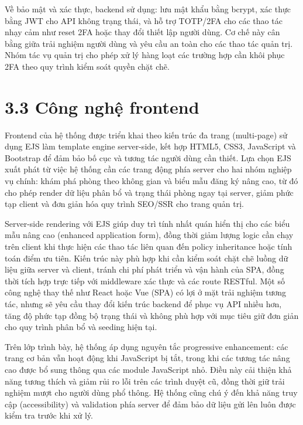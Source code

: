 Về bảo mật và xác thực, backend sử dụng: lưu mật khẩu bằng bcrypt, xác thực bằng JWT cho API không trạng thái, và hỗ trợ TOTP/2FA cho các thao tác nhạy cảm như reset 2FA hoặc thay đổi thiết lập người dùng. Cơ chế này cân bằng giữa trải nghiệm người dùng và yêu cầu an toàn cho các thao tác quản trị. Nhóm tác vụ quản trị cho phép xử lý hàng loạt các trường hợp cần khôi phục 2FA theo quy trình kiểm soát quyền chặt chẽ.

\section*{3.3 Công nghệ frontend}
Frontend của hệ thống được triển khai theo kiến trúc đa trang (multi-page) sử dụng EJS làm template engine server-side, kết hợp HTML5, CSS3, JavaScript và Bootstrap để đảm bảo bố cục và tương tác người dùng cần thiết. Lựa chọn EJS xuất phát từ việc hệ thống cần các trang động phía server cho hai nhóm nghiệp vụ chính: khám phá phòng theo không gian và biểu mẫu đăng ký nâng cao, từ đó cho phép render dữ liệu phân bổ và trạng thái phòng ngay tại server, giảm phức tạp client và đơn giản hóa quy trình SEO/SSR cho trang quản trị.

Server-side rendering với EJS giúp duy trì tính nhất quán hiển thị cho các biểu mẫu nâng cao (enhanced application form), đồng thời giảm lượng logic cần chạy trên client khi thực hiện các thao tác liên quan đến policy inheritance hoặc tính toán điểm ưu tiên. Kiến trúc này phù hợp khi cần kiểm soát chặt chẽ luồng dữ liệu giữa server và client, tránh chi phí phát triển và vận hành của SPA, đồng thời tích hợp trực tiếp với middleware xác thực và các route RESTful. Một số công nghệ thay thế như React hoặc Vue (SPA) có lợi ở mặt trải nghiệm tương tác, nhưng sẽ yêu cầu thay đổi kiến trúc backend để phục vụ API nhiều hơn, tăng độ phức tạp đồng bộ trạng thái và không phù hợp với mục tiêu giữ đơn giản cho quy trình phân bổ và seeding hiện tại.

Trên lớp trình bày, hệ thống áp dụng nguyên tắc progressive enhancement: các trang cơ bản vẫn hoạt động khi JavaScript bị tắt, trong khi các tương tác nâng cao được bổ sung thông qua các module JavaScript nhỏ. Điều này cải thiện khả năng tương thích và giảm rủi ro lỗi trên các trình duyệt cũ, đồng thời giữ trải nghiệm mượt cho người dùng phổ thông. Hệ thống cũng chú ý đến khả năng truy cập (accessibility) và validation phía server để đảm bảo dữ liệu gửi lên luôn được kiểm tra trước khi xử lý.

